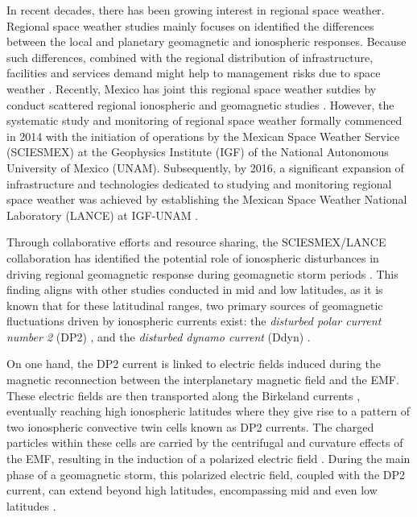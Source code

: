 \documentclass[a4paper,fleqn]{cas-dc}
\begin{document}
In recent decades, there has been growing interest in regional space weather. Regional space weather studies mainly focuses on identified the differences between the local and planetary geomagnetic and ionospheric responses. Because such differences, combined with the regional distribution of infrastructure, facilities and services demand might help to management risks due to space weather \citep[see][and references there in]{gic_czech, gic_brazil,gic}. Recently, Mexico has joint this regional space weather sutdies by conduct scattered regional ionospheric and geomagnetic studies \citep{MEXART2003, MEXART2005, MEXART_iono_dist, MEXART_iono_dist2, mario_rodriguez2011, lopez-montes, mario_rodriguez2014, iono-resp2016, lenica}. However, the systematic study and monitoring of regional space weather formally commenced in 2014 with the initiation of operations by the Mexican Space Weather Service (SCIESMEX) at the Geophysics Institute (IGF) of the National Autonomous University of Mexico (UNAM). Subsequently, by 2016, a significant expansion of infrastructure and technologies dedicated to studying and monitoring regional space weather was achieved by establishing the Mexican Space Weather National Laboratory (LANCE) at IGF-UNAM \citep{sciesmex_art}.

Through collaborative efforts and resource sharing, the SCIESMEX/LANCE collaboration has identified the potential role of ionospheric disturbances in driving regional geomagnetic response during geomagnetic storm periods \citep[see][]{esmeralda, dramaria_1, dramaria7, P-corona1, P-corona2}. This finding aligns with other studies conducted in mid and low latitudes, as it is known that for these latitudinal ranges, two primary sources of geomagnetic fluctuations driven by ionospheric currents exist: the \emph{disturbed polar current number 2} (DP2) \citep{nishida_68_coherence, nishida_68_fluctuations, nishida_66_knee}, and the \emph{disturbed dynamo current} (Ddyn) \citep{blanc_ddyn}.

On one hand, the DP2 current is linked to electric fields induced during the magnetic reconnection between the interplanetary magnetic field and the EMF. These electric fields are then transported along the Birkeland currents \citep{dp2PPEF, dp2_diag}, eventually reaching high ionospheric latitudes where they give rise to a pattern of two ionospheric convective twin cells known as DP2 currents. The charged particles within these cells are carried by the centrifugal and curvature effects of the EMF, resulting in the induction of a polarized electric field \citep{Hepner_a, Hepner_b, Pudovkin, blanc_caudal, Denisenko}. During the main phase of a geomagnetic storm, this polarized electric field, coupled with the DP2 current, can extend beyond high latitudes, encompassing mid and even low latitudes \citep{nishida_66_knee, nishida_68_coherence, nishida_andobayashi_67}.
\end{document}

